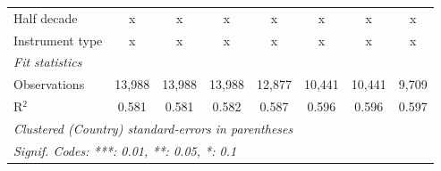 \begin{tabular}{lccccccc}
   Half decade                                                                                              & x            & x            & x            & x            & x            & x            & x\\  
   Instrument type                                                                                          & x            & x            & x            & x            & x            & x            & x\\  
   \midrule \emph{Fit statistics}\\
   Observations                                                                                             & 13,988       & 13,988       & 13,988       & 12,877       & 10,441       & 10,441       & 9,709\\  
   R$^2$                                                                                                    & 0.581        & 0.581        & 0.582        & 0.587        & 0.596        & 0.596        & 0.597\\  
   \midrule
   \multicolumn{8}{l}{\emph{Clustered (Country) standard-errors in parentheses}}\\
   \multicolumn{8}{l}{\emph{Signif. Codes: ***: 0.01, **: 0.05, *: 0.1}}\\
\end{tabular}
\par\endgroup



